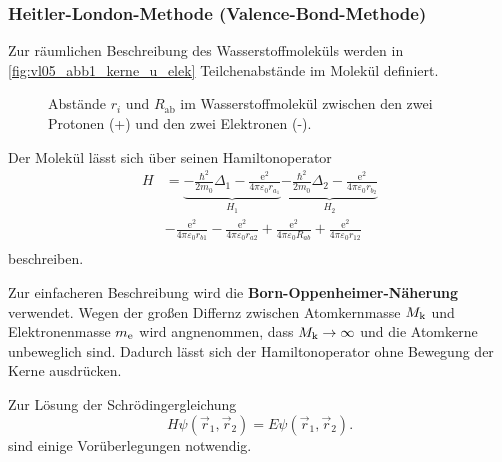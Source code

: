 \subsubsection{Heitler-London-Methode (Valence-Bond-Methode)}
	Zur räumlichen Beschreibung des Wasserstoffmoleküls werden in
	\autoref{fig:vl05_abb1_kerne_u_elek} Teilchenabstände im Molekül definiert.
	\begin{figure}[H]
		\centering
		\caption{Abstände $r_i$ und $R_\text{ab}$ im Wasserstoffmolekül zwischen den zwei Protonen (+) und den zwei Elektronen (-).}
		\label{fig:vl05_abb1_kerne_u_elek}
	\end{figure}
	Der Molekül lässt sich über seinen Hamiltonoperator
	\begin{equation}
		\label{eq:3.23}
		\begin{split}
			H &= \underbrace{- \frac{\hbar ^2}{2 m_0} \Delta_1 - \frac{\mathrm{e}^2}{4 \pi \varepsilon_0 r_{a_1}}}_{H_1}  \underbrace{- \frac{\hbar ^2}{2 m_0} \Delta_2 - \frac{\mathrm{e}^2}{4 \pi \varepsilon_0 r_{b_2}}}_{H_2}\\
		&- \frac{\mathrm{e}^2}{4 \pi \varepsilon_0 r_{b1}} - \frac{\mathrm{e}^2}{4 \pi \varepsilon_0 r_{a 2}} + \frac{\mathrm{e}^2}{4 \pi \varepsilon_0 R_{ab}}+ \frac{\mathrm{e}^2}{4 \pi \varepsilon_0 r_{12}} \\
		\end{split}
	\end{equation}
	beschreiben. 
	\begin{verbal}
		Zur einfacheren Beschreibung wird die \textbf{Born-Oppenheimer-Näherung} verwendet. 
		Wegen der großen Differnz zwischen Atomkernmasse $M_\text k$ und Elektronenmasse $m_\text e$ wird angnenommen, dass $M_\text k\to\infty$ und die Atomkerne unbeweglich sind. 
		Dadurch lässt sich der Hamiltonoperator ohne Bewegung der Kerne ausdrücken.
	\end{verbal}
	
	
	Zur Lösung der Schrödingergleichung
	\begin{equation}
		\label{eq:3.24}
		H \psi\left( \vec{r}_{1}, \vec{r}_{2} \right) = E \psi \left( \vec{r}_{1}, \vec{r}_{2} \right).
	\end{equation} 
	sind einige Vorüberlegungen notwendig.

